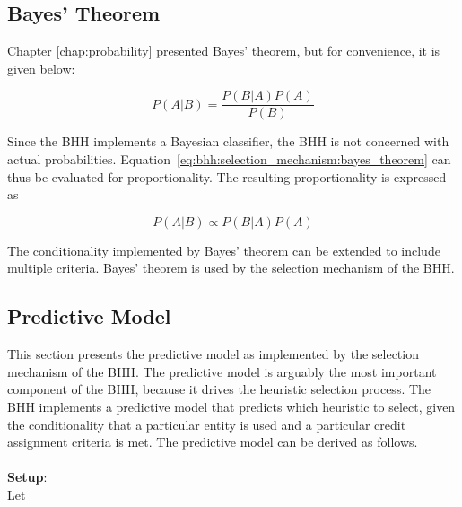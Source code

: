 \subsection{Bayes' Theorem}\label{sec:bhh:selection_mechanism:bayes_theorem}

Chapter \ref{chap:probability} presented Bayes' theorem, but for convenience, it is given below:

\begin{equation}
      \label{eq:bhh:selection_mechanism:bayes_theorem}
      P(A \vert B) = \frac{P(B \vert A)P(A)}{P(B)}
\end{equation}

Since the \acs{BHH} implements a Bayesian classifier, the \acs{BHH} is not concerned with actual probabilities. Equation~\eqref{eq:bhh:selection_mechanism:bayes_theorem} can thus be evaluated for proportionality. The resulting proportionality is expressed as

\begin{equation}
      \label{eq:bhh:selection_mechanism:bayes_theorem_prop_to}
      P(A \vert B) \propto P(B \vert A)P(A)
\end{equation}

The conditionality implemented by Bayes' theorem can be extended to include multiple criteria. Bayes' theorem is used by the selection mechanism of the \acs{BHH}.

\subsection{Predictive Model}\label{sec:bhh:selection_mechanism:predictive_model}

This section presents the predictive model as implemented by the selection mechanism of the \acs{BHH}. The predictive model is arguably the most important component of the \acs{BHH}, because it drives the heuristic selection process. The \acs{BHH} implements a predictive model that predicts which heuristic to select, given the conditionality that a particular entity is used and a particular credit assignment criteria is met. The predictive model can be derived as follows.\\\\
\textbf{Setup}:
\\
Let

